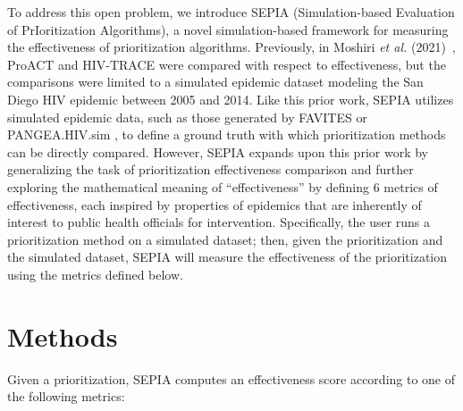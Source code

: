 \documentclass[twocolumn]{bmcart}%
\begin{document}
To address this open problem, we introduce SEPIA (Simulation-based Evaluation of PrIoritization Algorithms), a novel simulation-based framework for measuring the effectiveness of prioritization algorithms.
Previously, in Moshiri \textit{et al.} (2021)~\cite{moshiri2019ProACT}, ProACT and HIV-TRACE were compared with respect to effectiveness, but the comparisons were limited to a simulated epidemic dataset modeling the San Diego HIV epidemic between 2005 and 2014.
Like this prior work, SEPIA utilizes simulated epidemic data, such as those generated by FAVITES \cite{moshiri2018favites} or PANGEA.HIV.sim \cite{ratmann2016phylogenetic}, to define a ground truth with which prioritization methods can be directly compared.
However, SEPIA expands upon this prior work by generalizing the task of prioritization effectiveness comparison and further exploring the mathematical meaning of ``effectiveness'' by defining 6 metrics of effectiveness, each inspired by properties of epidemics that are inherently of interest to public health officials for intervention.
Specifically,
the user runs a prioritization method on a simulated dataset;
then, given the prioritization and the simulated dataset, SEPIA will measure the effectiveness of the prioritization using the metrics defined below.



\section*{Methods}
Given a prioritization, SEPIA computes an effectiveness score according to one of the following metrics:\\
\end{document}
